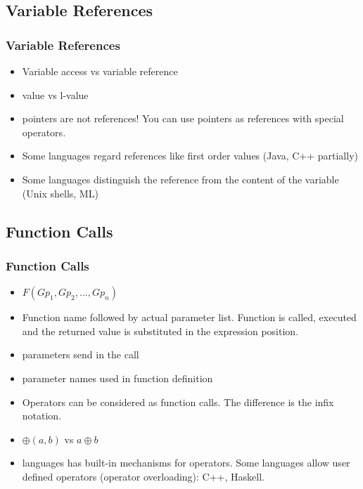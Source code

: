 \subsection{Variable References}
\begin{frame}
\frametitle{Variable References}
\begin{itemize}
\item Variable access vs variable reference
\item value vs l-value
\item \alert{pointers are not references!} You can use pointers as references with special
operators.
\item Some languages regard references like first order values (Java, C++ partially)
\item Some languages distinguish the reference from the content of the variable (Unix shells,
ML) 
\end{itemize}
\end{frame}

\subsection{Function Calls}
\begin{frame}
\frametitle{Function Calls}
 \begin{itemize}
  \item $F (Gp_1, Gp_2, ..., Gp_n) $
  \item Function name followed by actual parameter list. Function is called, executed and the
  returned value is substituted in the expression position.
  \item {} parameters send in the call
  \item {} parameter names used in function definition
  \item Operators can be considered as function calls. The difference is the infix notation.
  \item $\oplus (a,b)$ vs $a \oplus b$ 
  \item languages has built-in mechanisms for operators. Some languages allow user defined
  operators (operator overloading): C++, Haskell.
 \end{itemize}
\end{frame}


